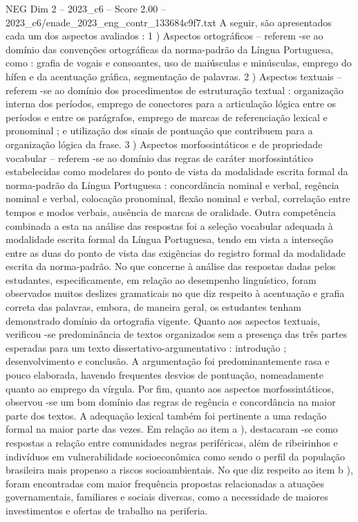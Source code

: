 \begin{textsample}{NEG Dim 2 – 2023\_c6 – Score 2.00 – 2023\_c6/enade\_2023\_eng\_contr\_133684c9f7.txt}
A seguir, são apresentados cada um dos aspectos avaliados : 1 ) Aspectos ortográficos – referem -se ao domínio das convenções ortográficas da norma-padrão da Língua Portuguesa, como : grafia de vogais e consoantes, uso de maiúsculas e minúsculas, emprego do hífen e da acentuação gráfica, segmentação de palavras. 2 ) Aspectos textuais – referem -se ao domínio dos procedimentos de estruturação textual : organização interna dos períodos, emprego de conectores para a articulação lógica entre os períodos e entre os parágrafos, emprego de marcas de referenciação lexical e pronominal ; e utilização dos sinais de pontuação que contribuem para a organização lógica da frase. 3 ) Aspectos morfossintáticos e de propriedade vocabular – referem -se ao domínio das regras de caráter morfossintático estabelecidas como modelares do ponto de vista da modalidade escrita formal da norma-padrão da Língua Portuguesa : concordância nominal e verbal, regência nominal e verbal, colocação pronominal, flexão nominal e verbal, correlação entre tempos e modos verbais, ausência de marcas de oralidade.
Outra competência combinada a esta na análise das respostas foi a seleção vocabular adequada à modalidade escrita formal da Língua Portuguesa, tendo em vista a interseção entre as duas do ponto de vista das exigências do registro formal da modalidade escrita da norma-padrão.
No que concerne à análise das respostas dadas pelos estudantes, especificamente, em relação ao desempenho linguístico, foram observados muitos deslizes gramaticais no que diz respeito à acentuação e grafia correta das palavras, embora, de maneira geral, os estudantes tenham demonstrado domínio da ortografia vigente.
Quanto aos aspectos textuais, verificou -se predominância de textos organizados sem a presença das três partes esperadas para um texto dissertativo-argumentativo : introdução ; desenvolvimento e conclusão.
A argumentação foi predominantemente rasa e pouco elaborada, havendo frequentes desvios de pontuação, nomeadamente quanto ao emprego da vírgula.
Por fim, quanto aos aspectos morfossintáticos, observou -se um bom domínio das regras de regência e concordância na maior parte dos textos.
A adequação lexical também foi pertinente a uma redação formal na maior parte das vezes.
Em relação ao item a ), destacaram -se como respostas a relação entre comunidades negras periféricas, além de ribeirinhos e indivíduos em vulnerabilidade socioeconômica como sendo o perfil da população brasileira mais propenso a riscos socioambientais.
No que diz respeito ao item b ), foram encontradas com maior frequência propostas relacionadas a atuações governamentais, familiares e sociais diversas, como a necessidade de maiores investimentos e ofertas de trabalho na periferia.

\end{textsample}
